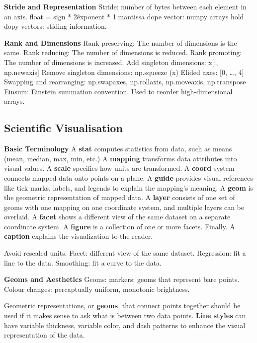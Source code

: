 \documentclass{article}
\begin{document}
\noindent \textbf{Stride and Representation}
Stride: number of bytes between each element in an axis.
float = sign * 2\^{exponent} * 1.mantissa
dope vector:
numpy arrays hold dopy vectors: stiding information.

\noindent \textbf{Rank and Dimensions}
Rank preserving: The number of dimensions is the same.
Rank reducing: The number of dimensions is reduced.
Rank promoting: The number of dimensions is increased.
Add singleton dimensions: x[:, np.newaxis]
Remove singleton dimensions: np.squeeze (x)
Elided axes: [0, \ldots, 4]
Swapping and rearranging: np.swapaxes, np.rollaxis, np.moveaxis, np.transpose
Einsum: Einstein summation convention. Used to reorder high-dimensional arrays.

\subsection*{Scientific Visualisation}

\noindent \textbf{Basic Terminology}
A \textbf{stat} computes statistics from data, such as means (mean, median, max, min,  etc.)
A \textbf{mapping} transforms data attributes into visual values.
A \textbf{scale} specifies how units are transformed.
A \textbf{coord} system connects mapped data onto points on a plane.
A \textbf{guide} provides visual references like tick marks, labels, and legends to explain the mapping's meaning.
A \textbf{geom} is the geometric representation of mapped data.
A \textbf{layer} consists of one set of geoms with one mapping on one coordinate system, and multiple layers can be overlaid.
A \textbf{facet} shows a different view of the same dataset on a separate coordinate system.
A \textbf{figure} is a collection of one or more facets. Finally.
A \textbf{caption} explains the visualization to the reader.

\noindent Avoid rescaled units. Facet: different view of the same dataset.
Regression: fit a line to the data. Smoothing: fit a curve to the data.

\noindent \textbf{Geoms and Aesthetics}
\noindent Geoms: markers: geoms that represent bare points.
Colour changes: percaptually uniform, monotonic brightness.

\noindent Geometric representations, or \textbf{geoms}, that connect points together should be used if it makes sense to ask what is between two data points.
\textbf{Line styles} can have variable thickness, variable color, and dash patterns to enhance the visual representation of the data.
\end{document}
